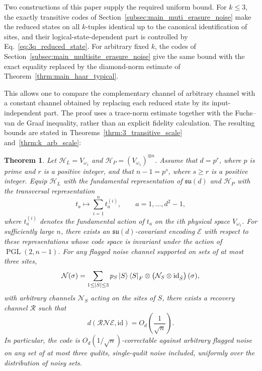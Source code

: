 \documentclass[10pt,twocolumn,superscriptaddress,aps,amsmath,amssymb,citeautoscript,floatfix,prx]{revtex4-2}
\newtheorem{theorem}{Theorem}
\theoremstyle{plain}
\theoremstyle{plain}
\theoremstyle{plain}
\theoremstyle{plain}
\theoremstyle{plain}
\theoremstyle{plain}
\theoremstyle{plain}
\theoremstyle{definition}
\theoremstyle{plain}
\begin{document}
Two constructions of this paper supply the required uniform bound. For $k\le3$, the exactly transitive codes of Section~\ref{subsec:main_muti_erasure_noise} 
make the reduced states on all $k$-tuples identical up to the canonical identification of sites, and their logical-state-dependent part is controlled 
by Eq.~\eqref{eq:3q_reduced_state}. For arbitrary fixed $k$, the codes of Section~\ref{subsec:main_multisite_erasure_noise} give the same bound with
 the exact equality replaced by the diamond-norm estimate of Theorem~\ref{thrm:main_haar_typical}.

This allows one to compare the complementary channel of arbitrary channel with a constant channel obtained by replacing 
each reduced state by its input-independent part. The proof uses a trace-norm estimate together with the Fuchs--van de Graaf inequality, 
rather than an explicit fidelity calculation. The resulting bounds are stated in Theorems~\ref{thrm:3_transitive_scale} and~\ref{thrm:k_arb_scale}:

\begin{theorem}
Let $\mathcal H_L=V_{\omega_1}$ and $\mathcal H_P=(V_{\omega_1})^{\otimes n}$. Assume that $d=p^r$, where $p$ is prime and $r$ is a positive integer, and that $n-1=p^s$, 
where $s\ge r$ is a positive integer. Equip $\mathcal H_L$ with the fundamental representation of $\mathfrak{su}(d)$ and $\mathcal H_P$ with the transversal representation
$$
t_a
\longmapsto
\sum_{i=1}^n t_a^{(i)},
\qquad
a=1,\ldots,d^2-1,
$$
where $t_a^{(i)}$ denotes the fundamental action of $t_a$ on the $i$th physical space $V_{\omega_1}$. 
For sufficiently large $n$, there exists an $\mathfrak{su}(d)$-covariant encoding $\mathcal E$ with respect 
to these representations whose code space is invariant under the action of $\operatorname{PGL}(2,n-1)$. 
For any flagged noise channel supported on sets of at most three sites,
$$
\mathcal N(\sigma)
=
\sum_{1\le|S|\le3}
p_S
\ket S\bra S_F
\otimes
\left(
\mathcal N_S\otimes\mathrm{id}_{\hat S}
\right)(\sigma),
$$
with arbitrary channels $\mathcal N_S$ acting on the sites of $S$, there exists a recovery channel $\mathcal R$ such that
$$
d(\mathcal R\mathcal N\mathcal E,\mathrm{id})
=
O_{d}\left(\frac{1}{\sqrt n}\right).
$$
In particular, the code is $O_{d}(1/\sqrt n)$-correctable against arbitrary 
flagged noise on any set of at most three qudits, single-qudit noise included, uniformly over the distribution of noisy sets.
\end{theorem}
\end{document}
